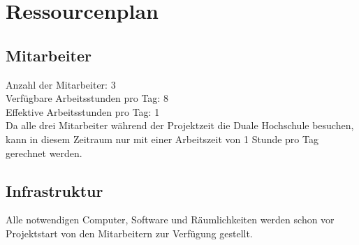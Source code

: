 \section{Ressourcenplan}
\subsection{Mitarbeiter}
Anzahl der Mitarbeiter: 3 \\

\noindent Verfügbare Arbeitsstunden pro Tag: 8 \\

\noindent Effektive Arbeitsstunden pro Tag: 1 \\

\noindent Da alle drei Mitarbeiter während der Projektzeit die Duale Hochschule besuchen, kann in diesem Zeitraum nur mit einer Arbeitszeit von 1 Stunde pro Tag gerechnet werden.

\subsection{Infrastruktur}
Alle notwendigen Computer, Software und Räumlichkeiten werden schon vor Projektstart von den Mitarbeitern zur Verfügung gestellt.